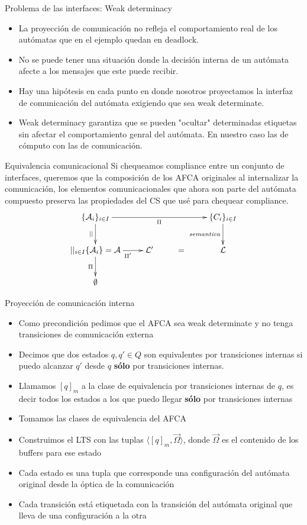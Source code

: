 \documentclass[10pt,xcolor={table,dvipsnames},t]{beamer}
\begin{document}
\begin{frame}{Problema de las interfaces: Weak determinacy}
\begin{itemize}
    \item La proyección de comunicación no refleja el comportamiento real de los autómatas que en el ejemplo quedan en deadlock.
    \item No se puede tener una situación donde la decisión interna de un autómata afecte a los mensajes que este puede recibir.
    \item Hay una hipótesis en cada punto en donde nosotros proyectamos la interfaz de comunicación del autómata exigiendo que sea weak determinate.
    \item Weak determinacy garantiza que se pueden "ocultar" determinadas etiquetas sin afectar el comportamiento genral del autómata. En nuestro caso las de cómputo con las de comunicación.
\end{itemize}
\end{frame}

\begin{frame}{Equivalencia comunicacional}
Si chequeamos compliance entre un conjunto de interfaces, queremos que la composición de los AFCA originales al internalizar la comunicación, los elementos comunicacionales que ahora son parte del autómata compuesto preserva las propiedades del CS que usé para chequear compliance.
$$
\xymatrix{   
	\{\mathcal{A}_i\}_{i \in I} \ar[rrr]_{\Pi} \ar[d]_{||} & & & \{C_i\}_{i \in I}  \ar[d]_{semantica}  \\
	  {||_{i \in I}\{\mathcal{A}_i\}= \mathcal{A}} \ar[r]_{\ \ \ \ \Pi'} \ar[d]_{\Pi} & \mathcal{L}' & = & {\mathcal{L}}  \\
	  \emptyset
}
$$
\end{frame}

\begin{frame}{Proyección de comunicación interna}
\begin{itemize}
    \item Como precondición pedimos que el AFCA sea weak determinate y no tenga transiciones de comunicación externa
    \item Decimos que dos estados $q, q' \in Q$ son equivalentes por transiciones internas si puedo alcanzar $q'$ desde $q$ \textbf{sólo} por transiciones internas.
    \item Llamamos $[q]_m$ a la clase de equivalencia por transiciones internas de $q$, es decir todos los estados a los que puedo llegar \textbf{sólo} por transiciones internas 
    \item Tomamos las clases de equivalencia del AFCA
    \item Construimos el LTS con las tuplas $\langle [q]_m, \overrightarrow{\Omega} \rangle$, donde $\overrightarrow{\Omega}$ es el contenido de los buffers para ese estado
    \item Cada estado es una tupla que corresponde una configuración del autómata original desde la óptica de la comunicación
    \item Cada transición está etiquetada con la transición del autómata original que lleva de una configuración a la otra
\end{itemize}
\end{frame}
\end{document}
